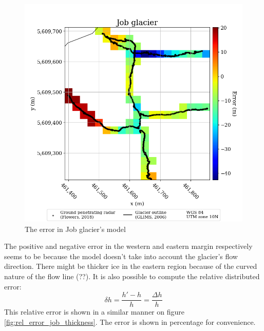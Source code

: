 \documentclass[a4, 12pt]{article}
\begin{document}
\begin{figure}[h!]
\centering
\includegraphics[scale=0.4]{../job_kluane_maps/Job glacier_error.png}
\caption{The error in Job glacier's model}
\label{fig:error_job_thickness}
\end{figure}
The positive and negative error in the western and eastern margin respectively seems to be because the model doesn't take into account the glacier's flow direction. There might be thicker ice in the eastern region because of the curved nature of the flow line (??). It is also possible to compute the relative distributed error: \[\delta h = \frac{h' - h}{h} = \frac{\Delta h}{h}\]
This relative error is shown in a similar manner on figure \ref{fig:rel_error_job_thickness}. The error is shown in percentage for convenience.
\end{document}
